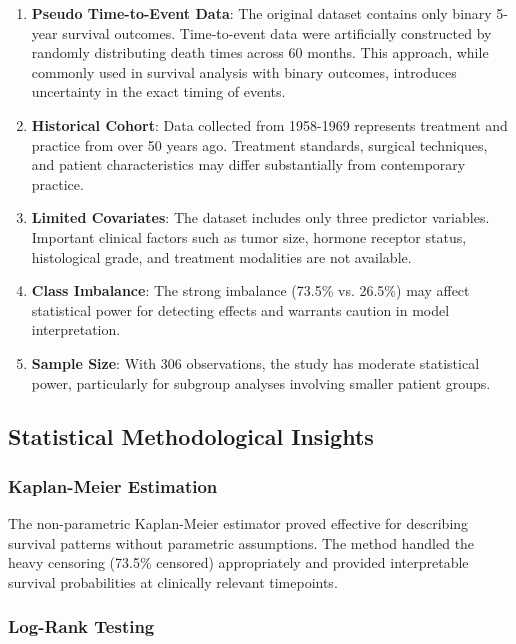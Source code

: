 \documentclass[12pt,a4paper]{article}
\begin{document}
\begin{enumerate}
    \item \textbf{Pseudo Time-to-Event Data}: The original dataset contains only binary 5-year survival outcomes. Time-to-event data were artificially constructed by randomly distributing death times across 60 months. This approach, while commonly used in survival analysis with binary outcomes, introduces uncertainty in the exact timing of events.
    
    \item \textbf{Historical Cohort}: Data collected from 1958-1969 represents treatment and practice from over 50 years ago. Treatment standards, surgical techniques, and patient characteristics may differ substantially from contemporary practice.
    
    \item \textbf{Limited Covariates}: The dataset includes only three predictor variables. Important clinical factors such as tumor size, hormone receptor status, histological grade, and treatment modalities are not available.
    
    \item \textbf{Class Imbalance}: The strong imbalance (73.5\% vs. 26.5\%) may affect statistical power for detecting effects and warrants caution in model interpretation.
    
    \item \textbf{Sample Size}: With 306 observations, the study has moderate statistical power, particularly for subgroup analyses involving smaller patient groups.
\end{enumerate}

\subsection{Statistical Methodological Insights}

\subsubsection{Kaplan-Meier Estimation}

The non-parametric Kaplan-Meier estimator proved effective for describing survival patterns without parametric assumptions. The method handled the heavy censoring (73.5\% censored) appropriately and provided interpretable survival probabilities at clinically relevant timepoints.

\subsubsection{Log-Rank Testing}
\end{document}
